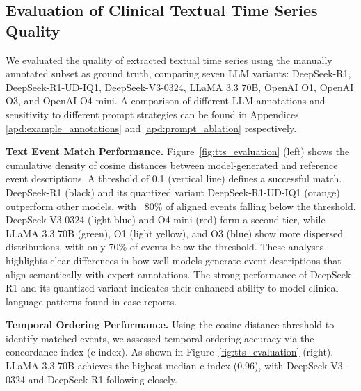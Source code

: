 % 


\subsection{Evaluation of Clinical Textual Time Series Quality}

We evaluated the quality of extracted textual time series using the manually annotated subset as ground truth, comparing seven LLM variants: DeepSeek-R1, DeepSeek-R1-UD-IQ1, DeepSeek-V3-0324, LLaMA 3.3 70B, OpenAI O1, OpenAI O3, and OpenAI O4-mini. A comparison of different LLM annotations and sensitivity to different prompt strategies can be found in Appendices \ref{apd:example_annotations} and \ref{apd:prompt_ablation} respectively.


\textbf{Text Event Match Performance.} Figure~\ref{fig:tts_evaluation} (left) shows the cumulative density of cosine distances between model-generated and reference event descriptions. A threshold of 0.1 (vertical line) defines a successful match. DeepSeek-R1 (black) and its quantized variant DeepSeek-R1-UD-IQ1 (orange) outperform other models, with ~80\% of aligned events falling below the threshold. DeepSeek-V3-0324 (light blue) and O4-mini (red) form a second tier, while LLaMA 3.3 70B (green), O1 (light yellow), and O3 (blue) show more dispersed distributions, with only 70\% of events below the threshold. These analyses highlights clear differences in how well models generate event descriptions that align semantically with expert annotations. The strong performance of DeepSeek-R1 and its quantized variant indicates their enhanced ability to model clinical language patterns found in case reports.


\textbf{Temporal Ordering Performance.} Using the cosine distance threshold to identify matched events, we assessed temporal ordering accuracy via the concordance index (c-index).
As shown in Figure~\ref{fig:tts_evaluation} (right), LLaMA 3.3 70B achieves the highest median c-index (0.96), with DeepSeek-V3-0324 and DeepSeek-R1 following closely.

